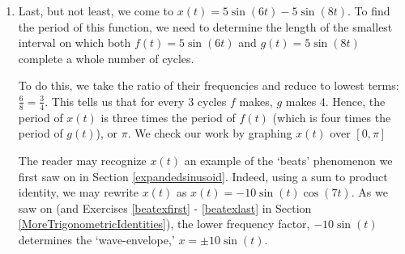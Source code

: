 \begin{ex}
\begin{enumerate}
\begin{center}
{\boldmath $x(t)= 2(t+3) \sin\left(2t + \frac{\pi}{4}\right)$} and $x = \pm 2(t+3)$ \\



\end{center}

The phenomenon illustrated here is `forced' motion.  That is, we imagine that the entire apparatus on which the spring is attached is oscillating as well.  

\smallskip

In this particular case, we are witnessing a `resonance' effect -- the frequency of the external oscillation matches the frequency of the motion of the object on the spring. In a mechanical system, this will result in some sort of structural failure.\footnote{The reader is invited to investigate the destructive implications of \href{http://en.wikipedia.org/wiki/Resonance}{\underline{resonance}}.}



\vspace{-.1in}

\item Last, but not least, we come to  $x(t) = 5\sin(6t) - 5\sin(8t)$.  To find the period of this function, we need to determine the length of the smallest interval on which both $f(t) = 5\sin(6t)$ and $g(t) = 5\sin(8t)$ complete a whole number of cycles. 

\smallskip

To do this, we take the ratio of their frequencies and reduce to lowest terms:  $\frac{6}{8} = \frac{3}{4}$.  This tells us that for every $3$ cycles $f$ makes, $g$ makes $4$. Hence,  the period of $x(t)$ is three times the period of $f(t)$ (which is four times the period of $g(t)$), or $\pi$.   We check our work by graphing $x(t)$  over  $[0,\pi]$

\smallskip

The reader may recognize $x(t)$  an example of the `beats' phenomenon we first saw on \pageref{beats} in Section \ref{expandedsinusoid}.  Indeed, using a sum to product identity, we may rewrite $x(t)$ as $x(t) =  -10 \sin(t) \cos(7t)$.  As we saw on \pageref{beats}  (and Exercises \ref{beatexfirst} - \ref{beatexlast} in Section \ref{MoreTrigonometricIdentities}), the lower frequency factor, $-10\sin(t)$ determines the `wave-envelope,'   $x = \pm 10 \sin(t)$.  


\begin{center}


\end{center}
\end{enumerate}
\end{ex}
